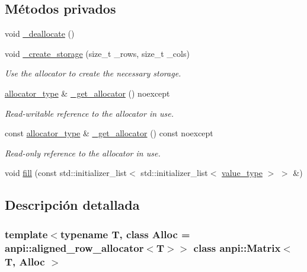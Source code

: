 \subsection*{Métodos privados}
\begin{DoxyCompactItemize}
\item 
void \hyperlink{classanpi_1_1Matrix_abdb7fc545cefe3fb0efc62b2bfbd7ac2}{\+\_\+deallocate} ()
\item 
void \hyperlink{classanpi_1_1Matrix_a4a02a0adb2750cabbbb8437d52b61452}{\+\_\+create\+\_\+storage} (size\+\_\+t \+\_\+rows, size\+\_\+t \+\_\+cols)
\begin{DoxyCompactList}\small\item\em Use the allocator to create the necessary storage. \end{DoxyCompactList}\item 
\hyperlink{classanpi_1_1Matrix_a3574b7528e3ddfb2f7cdf446be8286c1}{allocator\+\_\+type} \& \hyperlink{classanpi_1_1Matrix_a8bd792b99ec2206cfcb8a6ff6a7e9219}{\+\_\+get\+\_\+allocator} () noexcept
\begin{DoxyCompactList}\small\item\em Read-\/writable reference to the allocator in use. \end{DoxyCompactList}\item 
const \hyperlink{classanpi_1_1Matrix_a3574b7528e3ddfb2f7cdf446be8286c1}{allocator\+\_\+type} \& \hyperlink{classanpi_1_1Matrix_a49856d0af9e0fd8e47bedb487bedce7e}{\+\_\+get\+\_\+allocator} () const noexcept
\begin{DoxyCompactList}\small\item\em Read-\/only reference to the allocator in use. \end{DoxyCompactList}\item 
void \hyperlink{classanpi_1_1Matrix_aeb5933e3c5fcc3a031e956f8b24dbcb7}{fill} (const std\+::initializer\+\_\+list$<$ std\+::initializer\+\_\+list$<$ \hyperlink{classanpi_1_1Matrix_ad755076524c16fc494a392b0a66065cb}{value\+\_\+type} $>$ $>$ \&)
\end{DoxyCompactItemize}


\subsection{Descripción detallada}
\subsubsection*{template$<$typename T, class Alloc = anpi\+::aligned\+\_\+row\+\_\+allocator$<$\+T$>$$>$\newline
class anpi\+::\+Matrix$<$ T, Alloc $>$}


